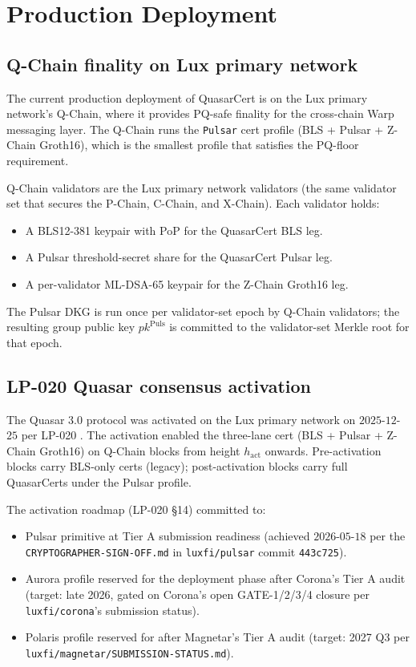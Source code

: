 \section{Production Deployment}
\label{sec:production}

\subsection{Q-Chain finality on Lux primary network}

The current production deployment of QuasarCert is on the Lux
primary network's Q-Chain, where it provides PQ-safe finality for
the cross-chain Warp messaging layer. The Q-Chain runs the
\texttt{Pulsar} cert profile (BLS + Pulsar + Z-Chain Groth16), which
is the smallest profile that satisfies the PQ-floor requirement.

Q-Chain validators are the Lux primary network validators (the same
validator set that secures the P-Chain, C-Chain, and X-Chain). Each
validator holds:

\begin{itemize}[leftmargin=2em,nosep]
\item A BLS12-381 keypair with PoP for the QuasarCert BLS leg.
\item A Pulsar threshold-secret share for the QuasarCert Pulsar leg.
\item A per-validator ML-DSA-65 keypair for the Z-Chain Groth16 leg.
\end{itemize}

The Pulsar DKG is run once per validator-set epoch by Q-Chain
validators; the resulting group public key $\mathit{pk}^{\mathrm{Puls}}$
is committed to the validator-set Merkle root for that epoch.

\subsection{LP-020 Quasar consensus activation}

The Quasar 3.0 protocol was activated on the Lux primary network on
$2025$-$12$-$25$ per LP-020 \cite{lp020}. The activation enabled the
three-lane cert (BLS + Pulsar + Z-Chain Groth16) on Q-Chain blocks
from height $h_{\mathrm{act}}$ onwards. Pre-activation blocks carry
BLS-only certs (legacy); post-activation blocks carry full
QuasarCerts under the Pulsar profile.

The activation roadmap (LP-020 \S14) committed to:

\begin{itemize}[leftmargin=2em,nosep]
\item Pulsar primitive at Tier A submission readiness (achieved
      $2026$-$05$-$18$ per the \texttt{CRYPTOGRAPHER-SIGN-OFF.md}
      in \texttt{luxfi/pulsar} commit \texttt{443c725}).
\item Aurora profile reserved for the deployment phase after
      Corona's Tier A audit (target: late 2026, gated on Corona's
      open GATE-1/2/3/4 closure per \texttt{luxfi/corona}'s
      submission status).
\item Polaris profile reserved for after Magnetar's Tier A audit
      (target: 2027 Q3 per \texttt{luxfi/magnetar/SUBMISSION-STATUS.md}).
\end{itemize}

